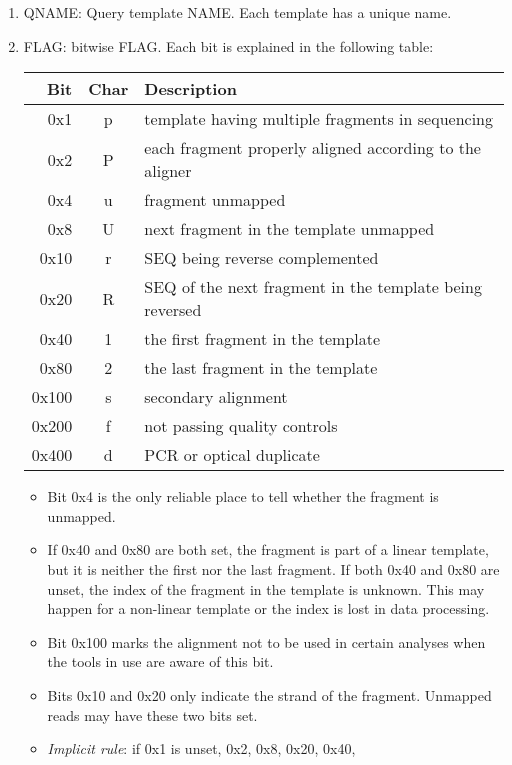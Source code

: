 \documentclass[10pt]{article}
\begin{document}
\begin{enumerate}
\item {\sf QNAME}: Query template NAME. Each template has a unique name.
\item {\sf FLAG}: bitwise FLAG. Each bit is explained in the following
  table:
  \begin{center}\small
  \begin{tabular}{rcl}
  \hline
  Bit & Char & Description\\
  \hline
  0x1 & p & template having multiple fragments in sequencing \\
  0x2 & P & each fragment properly aligned according to the aligner \\
  0x4 & u & fragment unmapped \\
  0x8 & U & next fragment in the template unmapped \\
  0x10 & r & {\sf SEQ} being reverse complemented \\
  0x20 & R & {\sf SEQ} of the next fragment in the template being reversed \\
  0x40 & 1 & the first fragment in the template \\
  0x80 & 2 & the last fragment in the template \\
  0x100 & s & secondary alignment\\
  0x200 & f & not passing quality controls \\
  0x400 & d & PCR or optical duplicate \\
  \hline
  \end{tabular}
  \end{center}
  \begin{itemize}
  \item Bit 0x4 is the only reliable place to tell whether the fragment is unmapped.
  \item If 0x40 and 0x80 are both set, the fragment is part of a linear
    template, but it is neither the first nor the last fragment. If both
    0x40 and 0x80 are unset, the index of the fragment in the template
    is unknown. This may happen for a non-linear template or the index
    is lost in data processing.
  \item Bit 0x100 marks the alignment not to be used in certain analyses
    when the tools in use are aware of this bit.
  \item Bits 0x10 and 0x20 only indicate the strand of the
    fragment. Unmapped reads may have these two bits set.
  \item \emph{Implicit rule}: if 0x1 is unset, 0x2, 0x8, 0x20, 0x40,

\end{itemize}
\end{enumerate}
\end{document}
